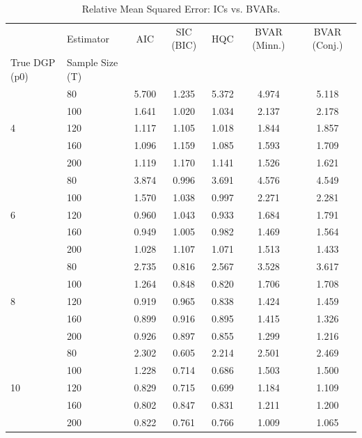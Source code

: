 \begin{table}[htbp]
\centering
\caption{Relative Mean Squared Error: ICs vs. BVARs.}
\label{tab:bvar_vs_ic}
\begin{tabular}{llccccc}
\toprule
 & Estimator & AIC & SIC (BIC) & HQC & BVAR (Minn.) & BVAR (Conj.) \\
True DGP (p0) & Sample Size (T) &  &  &  &  &  \\
\midrule
\multirow[t]{5}{*}{4} & 80 & 5.700 & 1.235 & 5.372 & 4.974 & 5.118 \\
 & 100 & 1.641 & 1.020 & 1.034 & 2.137 & 2.178 \\
 & 120 & 1.117 & 1.105 & 1.018 & 1.844 & 1.857 \\
 & 160 & 1.096 & 1.159 & 1.085 & 1.593 & 1.709 \\
 & 200 & 1.119 & 1.170 & 1.141 & 1.526 & 1.621 \\
\multirow[t]{5}{*}{6} & 80 & 3.874 & 0.996 & 3.691 & 4.576 & 4.549 \\
 & 100 & 1.570 & 1.038 & 0.997 & 2.271 & 2.281 \\
 & 120 & 0.960 & 1.043 & 0.933 & 1.684 & 1.791 \\
 & 160 & 0.949 & 1.005 & 0.982 & 1.469 & 1.564 \\
 & 200 & 1.028 & 1.107 & 1.071 & 1.513 & 1.433 \\
\multirow[t]{5}{*}{8} & 80 & 2.735 & 0.816 & 2.567 & 3.528 & 3.617 \\
 & 100 & 1.264 & 0.848 & 0.820 & 1.706 & 1.708 \\
 & 120 & 0.919 & 0.965 & 0.838 & 1.424 & 1.459 \\
 & 160 & 0.899 & 0.916 & 0.895 & 1.415 & 1.326 \\
 & 200 & 0.926 & 0.897 & 0.855 & 1.299 & 1.216 \\
\multirow[t]{5}{*}{10} & 80 & 2.302 & 0.605 & 2.214 & 2.501 & 2.469 \\
 & 100 & 1.228 & 0.714 & 0.686 & 1.503 & 1.500 \\
 & 120 & 0.829 & 0.715 & 0.699 & 1.184 & 1.109 \\
 & 160 & 0.802 & 0.847 & 0.831 & 1.211 & 1.200 \\
 & 200 & 0.822 & 0.761 & 0.766 & 1.009 & 1.065 \\
\bottomrule
\end{tabular}
\end{table}

